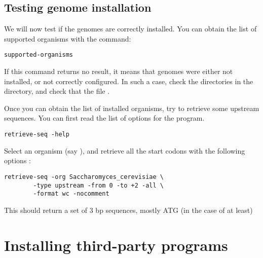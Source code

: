 \documentclass[12pt,a4paper, oneside]{scrreprt} %
\begin{document}
\section{Testing genome installation}

We will now test if the genomes are correctly installed. You can
obtain the list of supported organisms with the command:

\begin{lstlisting}
supported-organisms
\end{lstlisting}


If this command returns no result, it means that genomes were either
not installed, or not correctly configured. In such a case, check the
directories in the  directory, and check that the
file .

Once you can obtain the list of installed organisms, try to retrieve
some upstream sequences. You can first read the list of options for the
 program.

\begin{lstlisting}
retrieve-seq -help
\end{lstlisting}


Select an organism (say ), and
retrieve all the start codons with the following options :

\begin{lstlisting}
retrieve-seq -org Saccharomyces_cerevisiae \
        -type upstream -from 0 -to +2 -all \
        -format wc -nocomment
\end{lstlisting}


This should return a set of 3 bp sequences, mostly ATG (in the case of
 at least)





\chapter{Installing third-party programs}
\end{document}
